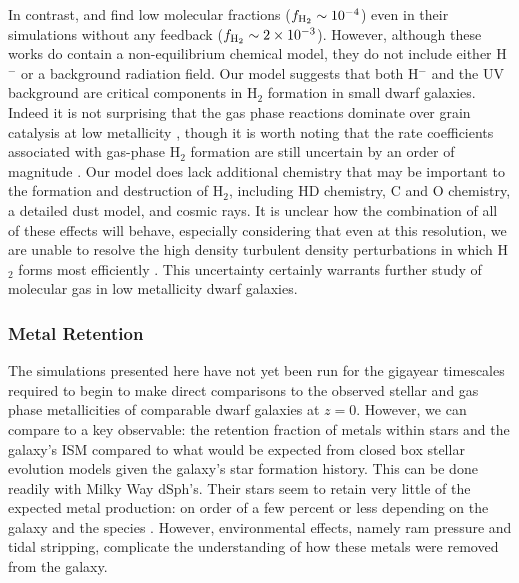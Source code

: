 \documentclass[fleqn,usenatbib,useAMS]{mnras}
\begin{document}
In contrast, \citet{Hu2016} and \citet{Hu2017} find low molecular fractions ($f_{\rm H_2} \sim 10^{-4}$) even in their simulations without any feedback ($f_{\rm H_2} \sim 2 \times 10^{-3}$). However, although these works do contain a non-equilibrium chemical model, they do not include either H$^{-}$ or a background radiation field. Our model suggests that both H$^{-}$ and the UV background are critical components in H$_2$ formation in small dwarf galaxies. Indeed it is not surprising that the gas phase reactions dominate over grain catalysis at low metallicity \citep{Glover2003}, though it is worth noting that the rate coefficients associated with gas-phase H$_2$ formation are still uncertain by an order of magnitude \citep{Glover2006,Glover2007}. Our model does lack additional chemistry that may be important to the formation and destruction of H$_2$, including HD chemistry, C and O chemistry, a detailed dust model, and cosmic rays. It is unclear how the combination of all of these effects will behave, especially considering that even at this resolution, we are unable to resolve the high density turbulent density perturbations in which H$_2$ forms most efficiently \citep{Glover2007}. This uncertainty certainly warrants further study of molecular gas in low metallicity dwarf galaxies.

\subsubsection{Metal Retention}
\label{sec:obs_metals}

The simulations presented here have not yet been run for the gigayear timescales required to begin to make direct comparisons to the observed stellar and gas phase metallicities of comparable dwarf galaxies at $z = 0$. However, we can compare to a key observable: the retention fraction of metals within stars and the galaxy's ISM compared to what would be expected from closed box stellar evolution models given the galaxy's star formation history. This can be done readily with Milky Way dSph's. Their stars seem to retain very little of the expected metal production: on order of a few percent or less depending on the galaxy and the species \citep{Kirby2011-metals}. However, environmental effects, namely ram pressure and tidal stripping, complicate the understanding of how these metals were removed from the galaxy. 
\end{document}
